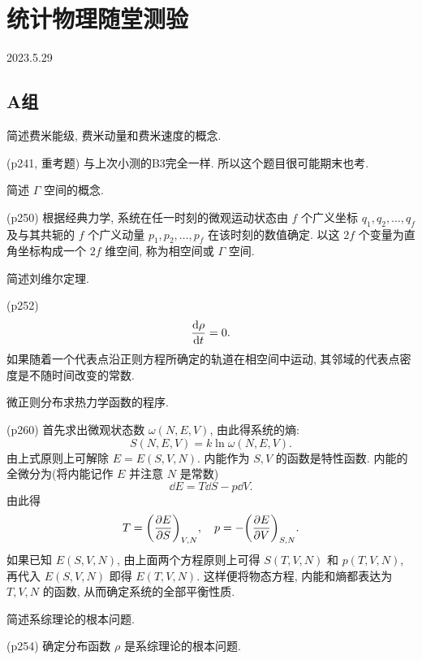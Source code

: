 \section{统计物理随堂测验}
2023.5.29
\subsection{A组}
\begin{questions}
  \qt 简述费米能级, 费米动量和费米速度的概念.
  \begin{solution}
    (p241, 重考题) 与上次小测的B3完全一样. 所以这个题目很可能期末也考.
  \end{solution}
  \qt 简述 $\Gamma$ 空间的概念.
  \begin{solution}
    (p250) 根据经典力学, 系统在任一时刻的微观运动状态由 $f$ 个广义坐标 $q_1, q_2, \dots, q_f$ 及与其共轭的 $f$ 个广义动量 $p_1, p_2, \dots, p_f$ 在该时刻的数值确定. 以这 $2f$ 个变量为直角坐标构成一个 $2f$ 维空间, 称为相空间或 $\Gamma$ 空间.
  \end{solution}
  \qt 简述刘维尔定理.
  \begin{solution}
    (p252)
    \begin{equation}
      \dv{\rho}{t} = 0.
    \end{equation}
    如果随着一个代表点沿正则方程所确定的轨道在相空间中运动, 其邻域的代表点密度是不随时间改变的常数.
  \end{solution}
  \qt 微正则分布求热力学函数的程序.
  \begin{solution}
    (p260) 首先求出微观状态数 $\omega(N, E, V)$, 由此得系统的熵:
    \begin{equation}
      S(N, E, V) = k \ln \omega(N, E, V).
    \end{equation}
    由上式原则上可解除 $E = E(S, V, N)$. 内能作为 $S, V$ 的函数是特性函数. 内能的全微分为(将内能记作 $E$ 并注意 $N$ 是常数)
    \begin{equation}
      \dd E = T\dd S - p\dd V.
    \end{equation}
    由此得
    \begin{equation}
      T = \qty(\pdv{E}{S})_{V,N} \qc p = -\qty(\pdv{E}{V})_{S,N}.
    \end{equation}
    如果已知 $E(S,V,N)$, 由上面两个方程原则上可得 $S(T, V, N)$ 和 $p(T, V, N)$, 再代入 $E(S,V,N)$ 即得 $E(T, V, N)$. 这样便将物态方程, 内能和熵都表达为 $T, V, N$ 的函数, 从而确定系统的全部平衡性质.
  \end{solution}
  \qt 简述系综理论的根本问题.
  \begin{solution}
    (p254) 确定分布函数 $\rho$ 是系综理论的根本问题.
  \end{solution}
\end{questions}
